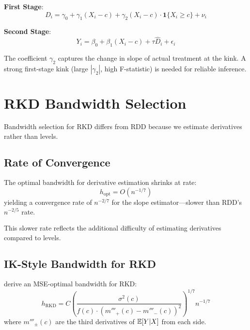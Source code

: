\textbf{First Stage}:
\begin{equation}
    D_i = \gamma_0 + \gamma_1 (X_i - c) + \gamma_2 (X_i - c) \cdot \mathbf{1}\{X_i \geq c\} + \nu_i
\end{equation}

\textbf{Second Stage}:
\begin{equation}
    Y_i = \beta_0 + \beta_1 (X_i - c) + \tau \hat{D}_i + \epsilon_i
\end{equation}

\begin{remark}
The coefficient $\gamma_2$ captures the change in slope of actual treatment at the kink. A strong first-stage kink (large $|\gamma_2|$, high F-statistic) is needed for reliable inference.
\end{remark}

\section{RKD Bandwidth Selection}
\label{sec:rkd_bandwidth}

Bandwidth selection for RKD differs from RDD because we estimate derivatives rather than levels.

\subsection{Rate of Convergence}

\begin{proposition}
\label{prop:rkd_rate}
The optimal bandwidth for derivative estimation shrinks at rate:
\begin{equation}
    h_{\text{opt}} = O(n^{-1/7})
\end{equation}
yielding a convergence rate of $n^{-2/7}$ for the slope estimator---slower than RDD's $n^{-2/5}$ rate.
\end{proposition}

This slower rate reflects the additional difficulty of estimating derivatives compared to levels.

\subsection{IK-Style Bandwidth for RKD}

\begin{definition}
\citet{card2015inference} derive an MSE-optimal bandwidth for RKD:
\begin{equation}
    h_{\text{RKD}} = C \left(\frac{\sigma^2(c)}{f(c) \cdot (m'''_+(c) - m'''_-(c))^2}\right)^{1/7} n^{-1/7}
\end{equation}
where $m'''_\pm(c)$ are the third derivatives of $\mathbb{E}[Y|X]$ from each side.
\end{definition}

